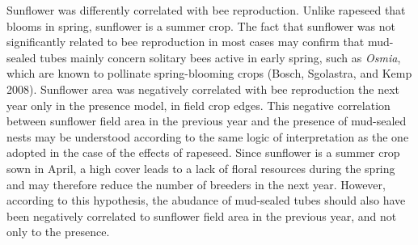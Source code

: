 \documentclass[smallextended]{svjour3}       %
\begin{document}
Sunflower was differently correlated with bee reproduction. Unlike
rapeseed that blooms in spring, sunflower is a summer crop. The fact
that sunflower was not significantly related to bee reproduction in most
cases may confirm that mud-sealed tubes mainly concern solitary bees
active in early spring, such as \emph{Osmia}, which are known to
pollinate spring-blooming crops (Bosch, Sgolastra, and Kemp 2008).
Sunflower area was negatively correlated with bee reproduction the next
year only in the presence model, in field crop edges. This negative
correlation between sunflower field area in the previous year and the
presence of mud-sealed nests may be understood according to the same
logic of interpretation as the one adopted in the case of the effects of
rapeseed. Since sunflower is a summer crop sown in April, a high cover
leads to a lack of floral resources during the spring and may therefore
reduce the number of breeders in the next year. However, according to
this hypothesis, the abudance of mud-sealed tubes should also have been
negatively correlated to sunflower field area in the previous year, and
not only to the presence.~
\end{document}
